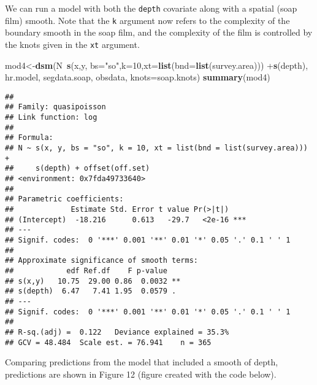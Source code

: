 \documentclass[]{article}
\newenvironment{Shaded}{}{}
\newcommand{\KeywordTok}[1]{\textcolor[rgb]{0.00,0.44,0.13}{\textbf{{#1}}}}
\newcommand{\DataTypeTok}[1]{\textcolor[rgb]{0.56,0.13,0.00}{{#1}}}
\newcommand{\DecValTok}[1]{\textcolor[rgb]{0.25,0.63,0.44}{{#1}}}
\newcommand{\StringTok}[1]{\textcolor[rgb]{0.25,0.44,0.63}{{#1}}}
\newcommand{\NormalTok}[1]{{#1}}
\begin{document}
We can run a model with both the \texttt{depth} covariate along with a
spatial (soap film) smooth. Note that the \texttt{k} argument now refers
to the complexity of the boundary smooth in the soap film, and the
complexity of the film is controlled by the knots given in the
\texttt{xt} argument.

\begin{Shaded}
\begin{Highlighting}[]
\NormalTok{mod4<-}\KeywordTok{dsm}\NormalTok{(N~}\KeywordTok{s}\NormalTok{(x,y, }\DataTypeTok{bs=}\StringTok{"so"}\NormalTok{,}\DataTypeTok{k=}\DecValTok{10}\NormalTok{,}\DataTypeTok{xt=}\KeywordTok{list}\NormalTok{(}\DataTypeTok{bnd=}\KeywordTok{list}\NormalTok{(survey.area)))}
\NormalTok{+}\KeywordTok{s}\NormalTok{(depth),}
\NormalTok{hr.model, segdata.soap, obsdata, }\DataTypeTok{knots=}\NormalTok{soap.knots)}
\KeywordTok{summary}\NormalTok{(mod4)}
\end{Highlighting}
\end{Shaded}

\begin{verbatim}
## 
## Family: quasipoisson 
## Link function: log 
## 
## Formula:
## N ~ s(x, y, bs = "so", k = 10, xt = list(bnd = list(survey.area))) + 
##     s(depth) + offset(off.set)
## <environment: 0x7fda49733640>
## 
## Parametric coefficients:
##             Estimate Std. Error t value Pr(>|t|)    
## (Intercept)  -18.216      0.613   -29.7   <2e-16 ***
## ---
## Signif. codes:  0 '***' 0.001 '**' 0.01 '*' 0.05 '.' 0.1 ' ' 1
## 
## Approximate significance of smooth terms:
##            edf Ref.df    F p-value   
## s(x,y)   10.75  29.00 0.86  0.0032 **
## s(depth)  6.47   7.41 1.95  0.0579 . 
## ---
## Signif. codes:  0 '***' 0.001 '**' 0.01 '*' 0.05 '.' 0.1 ' ' 1
## 
## R-sq.(adj) =  0.122   Deviance explained = 35.3%
## GCV = 48.484  Scale est. = 76.941    n = 365
\end{verbatim}

Comparing predictions from the model that included a smooth of depth,
predictions are shown in Figure 12 (figure created with the code below).
\end{document}
